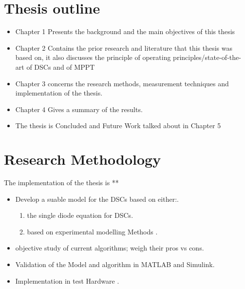 \section{Thesis outline}
\begin{itemize}
\item Chapter 1 Presents the background and the main objectives of this thesis \\
\item Chapter 2 Contains the prior research and literature that this thesis was based on, it also discusses the principle of operating principles/state-of-the-art  of \ac{DSCs} and of \ac{MPPT} \\
\item Chapter 3 concerns the  research methods, measurement techniques and implementation of the thesis.
\item Chapter 4 Gives a summary of the results. 
\item The thesis is Concluded and Future Work talked about in Chapter 5
\end {itemize}

\section{Research Methodology}
The implementation of the thesis is ** 
\begin{itemize}
\item Develop a suable model for the \ac{DSCs} based on either:.
	\begin{enumerate}
		\item the single diode equation for \ac{DSCs}.
		\item based on experimental modelling Methods .
	\end{enumerate}
\item objective study of current algorithms;  weigh their pros vs cons.
\item Validation of the Model and algorithm in MATLAB{\textregistered} and Simulink{\textregistered}.
\item Implementation in test Hardware .
\end {itemize}